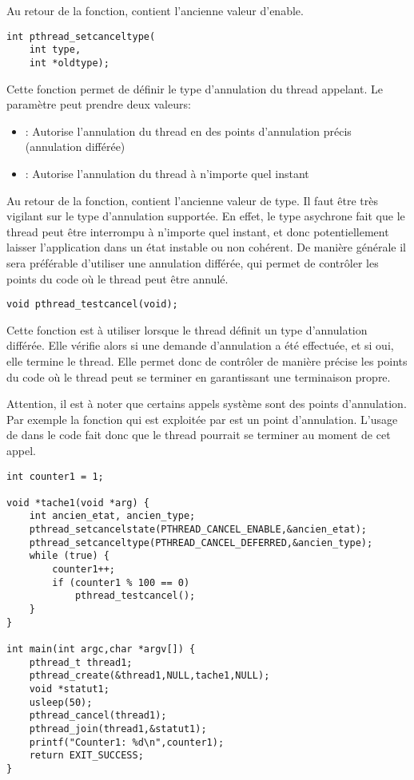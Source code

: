 Au retour de la fonction,  contient l'ancienne valeur d'enable.


\label{func:pthread_setcanceltype}

\begin{lstlisting}
int pthread_setcanceltype(
	int type,
	int *oldtype);
\end{lstlisting}
Cette fonction permet de définir le type d'annulation du thread appelant. Le paramètre  peut prendre deux valeurs:
\begin{itemize}
	\item {}: Autorise l'annulation du thread en des points d'annulation précis (annulation différée)
	\item {}: Autorise l'annulation du thread à n'importe quel instant
\end{itemize}

Au retour de la fonction,  contient l'ancienne valeur de type. Il faut \^etre très vigilant sur le type d'annulation supportée. En effet, le type asychrone fait que le thread peut \^etre interrompu à n'importe quel instant, et donc potentiellement laisser l'application dans un état instable ou non cohérent. De manière générale il sera préférable d'utiliser une annulation différée, qui permet de contrôler les points du code où le thread peut être annulé.


\label{func:pthread_testcancel}

\begin{lstlisting}
void pthread_testcancel(void);
\end{lstlisting}

Cette fonction est à utiliser lorsque le thread définit un type d'annulation différée. Elle vérifie alors si une demande d'annulation a été effectuée, et si oui, elle termine le thread. Elle permet donc de contr\^oler de manière précise les points du code o\`u le thread peut se terminer en garantissant une terminaison propre.

Attention, il est à noter que certains appels système sont des points d'annulation. Par exemple la fonction  qui est exploitée par  est un point d'annulation. L'usage de  dans le code fait donc que le thread pourrait se terminer au moment de cet appel.



\begin{lstlisting}[frame=trBL]
int counter1 = 1;

void *tache1(void *arg) {
    int ancien_etat, ancien_type;
    pthread_setcancelstate(PTHREAD_CANCEL_ENABLE,&ancien_etat);
    pthread_setcanceltype(PTHREAD_CANCEL_DEFERRED,&ancien_type);
    while (true) {
        counter1++;
        if (counter1 % 100 == 0)
            pthread_testcancel();
    }
}

int main(int argc,char *argv[]) {
    pthread_t thread1;
    pthread_create(&thread1,NULL,tache1,NULL);
    void *statut1;
    usleep(50);
    pthread_cancel(thread1);
    pthread_join(thread1,&statut1);
    printf("Counter1: %d\n",counter1);
    return EXIT_SUCCESS;
}
\end{lstlisting}

